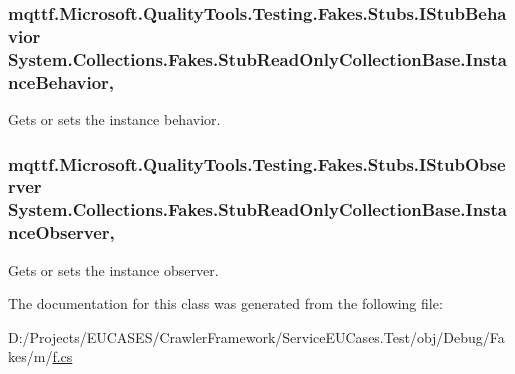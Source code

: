\hypertarget{class_system_1_1_collections_1_1_fakes_1_1_stub_read_only_collection_base_ae32b871292a77047b61c2c9e167e88e1}{
\subsubsection[{Instance\-Behavior}]{\setlength{\rightskip}{0pt plus 5cm}mqttf.\-Microsoft.\-Quality\-Tools.\-Testing.\-Fakes.\-Stubs.\-I\-Stub\-Behavior System.\-Collections.\-Fakes.\-Stub\-Read\-Only\-Collection\-Base.\-Instance\-Behavior\hspace{0.3cm}{\ttfamily [get]}, {\ttfamily [set]}}}\label{class_system_1_1_collections_1_1_fakes_1_1_stub_read_only_collection_base_ae32b871292a77047b61c2c9e167e88e1}


Gets or sets the instance behavior.

\hypertarget{class_system_1_1_collections_1_1_fakes_1_1_stub_read_only_collection_base_a7b954c4cfa1574e87bef93bf1e3d0a26}{
\subsubsection[{Instance\-Observer}]{\setlength{\rightskip}{0pt plus 5cm}mqttf.\-Microsoft.\-Quality\-Tools.\-Testing.\-Fakes.\-Stubs.\-I\-Stub\-Observer System.\-Collections.\-Fakes.\-Stub\-Read\-Only\-Collection\-Base.\-Instance\-Observer\hspace{0.3cm}{\ttfamily [get]}, {\ttfamily [set]}}}\label{class_system_1_1_collections_1_1_fakes_1_1_stub_read_only_collection_base_a7b954c4cfa1574e87bef93bf1e3d0a26}


Gets or sets the instance observer.



The documentation for this class was generated from the following file\-:\begin{DoxyCompactItemize}
\item 
D\-:/\-Projects/\-E\-U\-C\-A\-S\-E\-S/\-Crawler\-Framework/\-Service\-E\-U\-Cases.\-Test/obj/\-Debug/\-Fakes/m/\hyperlink{m_2f_8cs}{f.\-cs}\end{DoxyCompactItemize}
